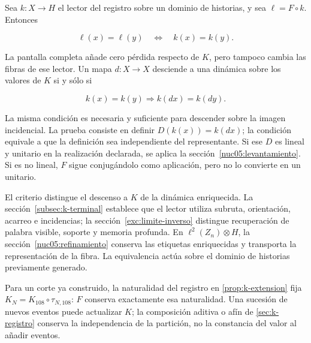 Sea \(k:X\to H\) el lector del registro sobre un dominio de historias, y sea \(\ell=F\circ k\). Entonces

\[
\ell(x)=\ell(y)\quad\Longleftrightarrow\quad k(x)=k(y).
\]

La pantalla completa añade cero pérdida respecto de \(K\), pero tampoco cambia las fibras de ese lector. Un mapa \(d:X\to X\) desciende a una dinámica sobre los valores de \(K\) si y sólo si

\[
k(x)=k(y)\Longrightarrow k(d x)=k(d y).
\]

La misma condición es necesaria y suficiente para descender sobre la imagen incidencial. La prueba consiste en definir \(D(k(x))=k(dx)\); la condición equivale a que la definición sea independiente del representante. Si ese \(D\) es lineal y unitario en la realización declarada, se aplica la sección~\ref{nuc05:levantamiento}. Si es no lineal, \(F\) sigue conjugándolo como aplicación, pero no lo convierte en un unitario.

El criterio distingue el descenso a \(K\) de la dinámica enriquecida. La sección~\ref{subsec:k-terminal} establece que el lector utiliza subruta, orientación, acarreo e incidencias; la sección~\ref{exc:limite-inverso} distingue recuperación de palabra visible, soporte y memoria profunda. En \(\ell^2(Z_n)\otimes H\), la sección~\ref{nuc05:refinamiento} conserva las etiquetas enriquecidas y transporta la representación de la fibra. La equivalencia actúa sobre el dominio de historias previamente generado.

Para un corte ya construido, la naturalidad del registro en \cref{prop:k-extension} fija \(K_N=K_{108}\circ\tau_{N,108}\): \(F\) conserva exactamente esa naturalidad. Una sucesión de nuevos eventos puede actualizar \(K\); la composición aditiva o afín de \cref{sec:k-registro} conserva la independencia de la partición, no la constancia del valor al añadir eventos.
